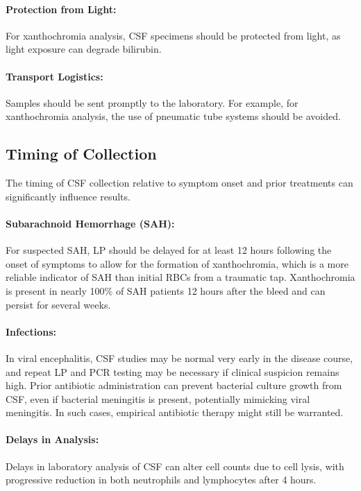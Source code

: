 \paragraph{Protection from Light:} For xanthochromia analysis, CSF specimens should be protected from light, as light exposure can degrade bilirubin.
	
\paragraph{Transport Logistics:} Samples should be sent promptly to the laboratory. For example, for xanthochromia analysis, the use of pneumatic tube systems should be avoided.
	
\subsection{Timing of Collection}
	
	The timing of CSF collection relative to symptom onset and prior treatments can significantly influence results.
	
	\paragraph{Subarachnoid Hemorrhage (SAH):} For suspected SAH, LP should be delayed for at least 12 hours following the onset of symptoms to allow for the formation of xanthochromia, which is a more reliable indicator of SAH than initial RBCs from a traumatic tap. Xanthochromia is present in nearly 100\% of SAH patients 12 hours after the bleed and can persist for several weeks.
	
	\paragraph{Infections:} In viral encephalitis, CSF studies may be normal very early in the disease course, and repeat LP and PCR testing may be necessary if clinical suspicion remains high. Prior antibiotic administration can prevent bacterial culture growth from CSF, even if bacterial meningitis is present, potentially mimicking viral meningitis. In such cases, empirical antibiotic therapy might still be warranted.
	
	\paragraph{Delays in Analysis:} Delays in laboratory analysis of CSF can alter cell counts due to cell lysis, with progressive reduction in both neutrophils and lymphocytes after 4 hours.
	

